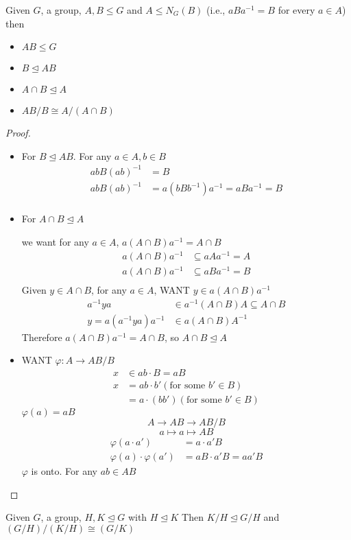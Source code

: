 \begin{theorem}
  Given $G$, a group, $A, B \le G$ and $A \le N_G(B)$
  (i.e., $aBa^{-1} = B$ for every $a \in A$)
  then 
  \begin{itemize}
    \item $AB \le G$ 
    \item $B \unlhd AB$ 
    \item $A \cap B \unlhd A$
    \item $AB/B \cong A / (A \cap B)$
  \end{itemize}
\end{theorem}

\begin{proof}
  \text{ }
  \begin{itemize}
    \item 
  For $B \unlhd AB$.
  For any $a \in A, b \in B$
  \begin{align*}
    abB(ab)^{-1} &= B \\
    abB(ab)^{-1} &=a(bBb^{-1})a^{-1} = aBa^{-1} = B \\
  \end{align*}
  \item For $A \cap B \unlhd A$

  we want for any $a \in A$, $a(A \cap B) a^{-1} = A \cap B$
  \begin{align*}
    a(A \cap B) a^{-1} &\subseteq aAa^{-1} = A \\
    a(A \cap B) a^{-1} &\subseteq aBa^{-1} = B \\
  \end{align*}
  Given $y \in A \cap B$, for any $a \in A$, WANT $y \in a(A \cap B) a^{-1}$
  \begin{align*}
    a^{-1}ya &\in a^{-1}(A\cap B)A \subseteq A \cap B \\
    y = a(a^{-1}ya)a^{-1} &\in a(A \cap B)A^{-1}
  \end{align*}
  Therefore $a(A \cap B) a^{-1} = A \cap B$, so $A \cap B \unlhd A$
  \item WANT $\varphi: A \to AB/B$
  \begin{align*}
    x &\in ab \cdot B = aB \\
    x &= ab \cdot b' (\text{for some }b' \in B)\\
    &= a\cdot (bb')(\text{for some }b' \in B)
  \end{align*}
  $\varphi(a) = aB$
  \[A \to AB \to AB/B\]
  \[a \mapsto a \mapsto AB\]
  \begin{align*}
    \varphi(a \cdot a') &= a\cdot a' B \\
    \varphi(a)\cdot \varphi(a') &= aB\cdot a'B = aa'B
  \end{align*}
  $\varphi$ is onto. For any $ab \in AB$
  \end{itemize}

\end{proof}

\begin{theorem}
  Given $G$, a group, $H, K \unlhd G$ with $H \unlhd K$ Then
  $K/H \unlhd G/H$ and $(G/H)/(K/H) \cong(G/K)$
\end{theorem}